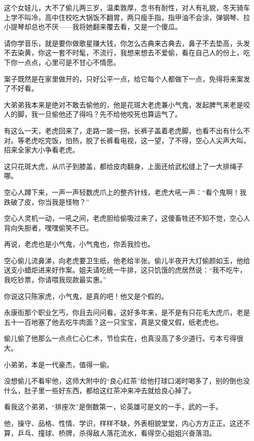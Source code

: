 \par 这个女娃儿，大不了偷儿两三岁，温柔敦厚，念书有耐性，对人有礼貌，冬天骑车上学不叫冷，高中住校吃大锅饭不翻胃，两只瘦手指，指甲油不会涂，弹钢琴、拉小提琴却总也不厌——我将她翻来覆去看，又是一个傻瓜。
\par 请你学音乐，就是要你做歌星赚大钱，你怎么古典来古典去，鼻子不去垫高，头发不去染黄，你这一套不时髦，不流行，我想来想去不爱偷，看在自己人的份上，吃下你一点点，心里可是不甘心不情愿。
\par 案子既然是在家里做开的，只好公平一点，给它每个人都做下一点，免得将来案发了不好看。
\par 大弟弟我本来是绝对不敢去偷他的，他是花斑大老虎兼小气鬼，发起脾气来老是咬人的脚，我一旦偷他还了得吗？先不给他咬死也算运气了。
\par 有这么一天，老虎回来了，走路一跛一拐，长裤子盖着老虎脚，也看不出有什么不对。等老虎吃完饭，怕热，脱了长裤看电视，这一望，了不得，空心人尖声大叫，招来全家大小争看老虎。
\par 这只花斑大虎，从爪子到膝盖，都给皮肉翻身，上面还给武松缝上了一大排绳子哪。
\par 空心人蹲下来，一声一声轻数虎爪上的整齐针线，老虎大吼一声：“看个鬼啊！我跌破了皮，你当我是怪物？”
\par 空心人灵机一动，一吼之间，老虎胆给偷吸过来了，这傻畜牲还不知不觉，空心人背向失胆者，嘿嘿偷笑不已。
\par 再说，老虎也是小气鬼，小气鬼也，你丢我捡也。
\par 空心偷儿流鼻涕，向老虎要卫生纸，他老给半张。偷儿半夜开大灯偷颜如玉，他给送支小蜡炬进来好作案。姐夫请吃统一牛排，这只饥饿的虎居然说：“我不吃牛，我吃钞票，你请喂我现款最实惠。”
\par 你说这只陈家虎，小气鬼，是真的吧！他又是个假的。
\par 永康街那个职业乞丐，你且去问问看，这好多年来，是不是有只花毛大虎爪，老是五十一百地塞了他去吃牛肉面？这一只宝宝，真是又傻又假，纸老虎也。
\par 偷儿偷了他那么一点点仁心仁术，节俭实在，也真没高了多少道行。亏本亏得很大。
\par 小弟弟，本是一代豪杰，值得一偷。
\par 没想偷儿不看牢他，这师大附中的“良心红茶”给他打球口渴时喝多了，别的倒也没什么，肚子里一些好东西，都给这红茶冲来冲去就给良心掉了。
\par 看我这个弟弟，“排座次”是倒数第一，论英雄可是文的一手，武的一手。
\par 他，操守、品格、性情、学识，样样不缺，外表相貌堂堂，内心方方正正。这还不算，乒乓、撞球、桥牌，杀得敌人落花流水，看得空心姐姐兴奋落泪。

